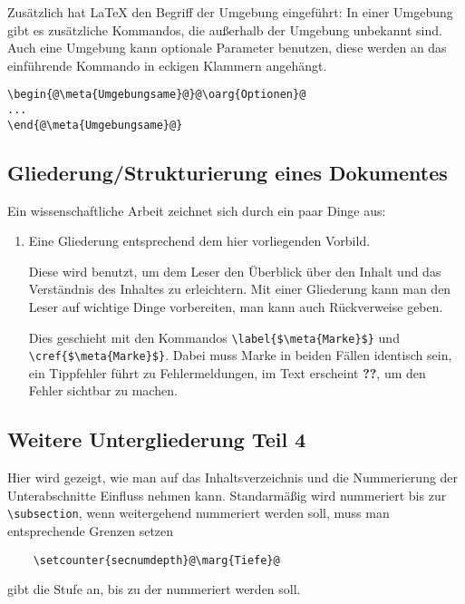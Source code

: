 \documentclass[ngerman,               %
               a4paper,               %
               fleqn,                 %
                     ]{scrreprt}
\begin{document}
   Zusätzlich hat \LaTeX{} den Begriff der Umgebung eingeführt: In einer
   Umgebung gibt es zusätzliche Kommandos, die außerhalb der Umgebung
   unbekannt sind. Auch eine Umgebung kann optionale Parameter benutzen,
   diese werden an das einführende Kommando in eckigen Klammern
   angehängt.
\begin{lstlisting}
\begin{@\meta{Umgebungsame}@}@\oarg{Optionen}@
...
\end{@\meta{Umgebungsame}@}
\end{lstlisting}


  \subsection{Gliederung/Strukturierung eines Dokumentes}

  Ein wissenschaftliche Arbeit zeichnet sich durch ein paar Dinge aus:
  \begin{enumerate}
    \item Eine Gliederung entsprechend dem hier vorliegenden Vorbild.

    Diese wird benutzt, um dem Leser den Überblick über den Inhalt und
    das Verständnis des Inhaltes zu erleichtern. Mit einer Gliederung
    kann man den Leser auf wichtige Dinge vorbereiten, man kann auch
    Rückverweise geben.

    Dies geschieht mit den Kommandos
    \lstinline[mathescape]|\label{$\meta{Marke}$}| und
    \lstinline[mathescape]|\cref{$\meta{Marke}$}|. Dabei muss Marke in
    beiden Fällen identisch sein, ein Tippfehler führt zu
    Fehlermeldungen, im Text erscheint \textbf{??}, um den Fehler
    sichtbar zu machen.

  \end{enumerate}



  \subsection{Weitere Untergliederung Teil 4}
  
  Hier wird gezeigt, wie man auf das Inhaltsverzeichnis und die
  Nummerierung der Unterabschnitte Einfluss nehmen kann. Standarmäßig
  wird nummeriert bis zur \lstinline|\subsection|, wenn weitergehend
  nummeriert werden soll, muss man entsprechende Grenzen setzen
  \begin{lstlisting}
    \setcounter{secnumdepth}@\marg{Tiefe}@
\end{lstlisting}
   gibt die Stufe an, bis zu der nummeriert werden soll.
  
\end{document}
